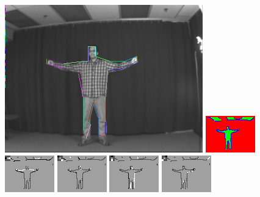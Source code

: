 \begin{figure}
\includegraphics[width=0.48 \linewidth]{output/2.detection/local_inference/out.s1.0040.d/thefinalparse.png}
\includegraphics[width=0.48 \linewidth]{output/2.detection/local_inference/out.s1.0040.d/local.x5.interior.png}
\includegraphics[width=0.24 \linewidth]{output/2.detection/local_inference/out.s1.0040.d/local.x5.orientations.0.png}
\includegraphics[width=0.24 \linewidth]{output/2.detection/local_inference/out.s1.0040.d/local.x5.orientations.1.png}
\includegraphics[width=0.24 \linewidth]{output/2.detection/local_inference/out.s1.0040.d/local.x5.orientations.2.png}
\includegraphics[width=0.24 \linewidth]{output/2.detection/local_inference/out.s1.0040.d/local.x5.orientations.3.png}

\end{figure}
